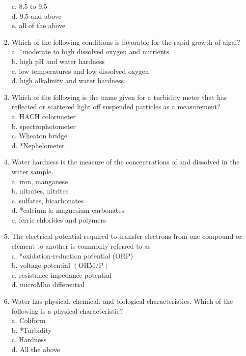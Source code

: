 \begin{enumerate}[1.]
c. 8.5 to 9.5\\
d. 9.5 and above\\
e. all of the above\\
\item Which of the following conditions is favorable for the rapid growth of algal?\\
a. *moderate to high dissolved oxygen and nutrients\\
b. high $\mathrm{pH}$ and water hardness\\
c. low temperatures and low dissolved oxygen\\
d. high alkalinity and water hardness\\
\item Which of the following is the name given for a turbidity meter that has reflected or scattered light off suspended particles as a measurement?\\
a. $\mathrm{HACH}$ colorimeter\\
b. spectrophotometer\\
c. Wheaton bridge\\
d. *Nephelometer\\
\item Water hardness is the measure of the concentrations of and dissolved in the water sample.\\
a. iron, manganese\\
b. nitrates, nitrites\\
c. sulfates, bicarbonates\\
d. *calcium \& magnesium carbonates\\
e. ferric chlorides and polymers\\
\item The electrical potential required to transfer electrons from one compound or element to another is commonly referred to as\\
a. *oxidation-reduction potential (ORP)\\
b. voltage potential $(\mathrm{OHM} / \mathrm{P})$\\
c. resistance-impedance potential\\
d. microMho differential\\
\item Water has physical, chemical, and biological characteristics. Which of the following is a physical characteristic?\\
a. Coliform\\
b. *Turbidity\\ 
c. Hardness\\
d. All the above\\

\end{enumerate}
